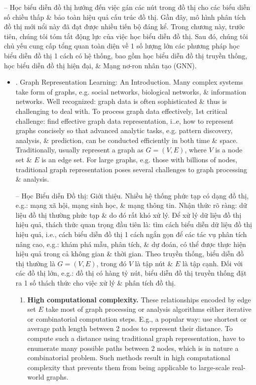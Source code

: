 \documentclass{article}
\begin{document}
\begin{itemize}
    -- Học biểu diễn đồ thị hướng đến việc gán các nút trong đồ thị cho các biểu diễn số chiều thấp \& bảo toàn hiệu quả cấu trúc đồ thị. Gần đây, mô hình phân tích đồ thị mới nổi này đã đạt được nhiều tiến bộ đáng kể. Trong chương này, trước tiên, chúng tôi tóm tắt động lực của việc học biểu diễn đồ thị. Sau đó, chúng tôi chủ yếu cung cấp tổng quan toàn diện về 1 số lượng lớn các phương pháp học biểu diễn đồ thị 1 cách có hệ thống, bao gồm học biểu diễn đồ thị truyền thống, học biểu diễn đồ thị hiện đại, \& Mạng nơ-ron nhân tạo (GNN).
    \begin{itemize}
        \item {. Graph Representation Learning: An Introduction.} Many complex systems take form of graphs, e.g. social networks, biological networks, \& information networks. Well recognized: graph data is often sophisticated \& thus is challenging to deal with. To process graph data effectively, 1st critical challenge: find effective graph data representation, i..e, how to represent graphs concisely so that advanced analytic tasks, e.g. pattern discovery, analysis, \& prediction, can be conducted efficiently in both time \& space. Traditionally, usually represent a graph as $G = (V,E)$, where $V$ is a node set \& $E$ is an edge set. For large graphs, e.g. those with billions of nodes, traditional graph representation poses several challenges to graph processing \& analysis.

        -- {\sf Học Biểu diễn Đồ thị: Giới thiệu.} Nhiều hệ thống phức tạp có dạng đồ thị, e.g.: mạng xã hội, mạng sinh học, \& mạng thông tin. Nhận thức rõ ràng: dữ liệu đồ thị thường phức tạp \& do đó rất khó xử lý. Để xử lý dữ liệu đồ thị hiệu quả, thách thức quan trọng đầu tiên là: tìm cách biểu diễn dữ liệu đồ thị hiệu quả, i.e., cách biểu diễn đồ thị 1 cách ngắn gọn để các tác vụ phân tích nâng cao, e.g.: khám phá mẫu, phân tích, \& dự đoán, có thể được thực hiện hiệu quả trong cả không gian \& thời gian. Theo truyền thống, biểu diễn đồ thị thường là $G = (V,E)$, trong đó $V$ là tập nút \& $E$ là tập cạnh. Đối với các đồ thị lớn, e.g.: đồ thị có hàng tỷ nút, biểu diễn đồ thị truyền thống đặt ra 1 số thách thức cho việc xử lý \& phân tích đồ thị.
        \begin{enumerate}
            \item {\bf High computational complexity.} These relationships encoded by edge set $E$ take most of graph processing or analysis algorithms either iterative or combinatorial computation steps. E.g., a popular way: use shortest or average path length between 2 nodes to represent their distance. To compute such a distance using traditional graph representation, have to enumerate many possible paths between 2 nodes, which is in nature a combinatorial problem. Such methods result in high computational complexity that prevents them from being applicable to large-scale real-world graphs.


\end{enumerate}
\end{itemize}
\end{itemize}
\end{document}
